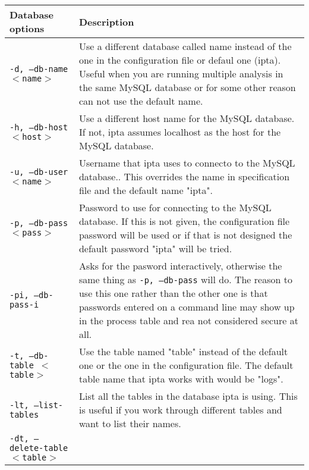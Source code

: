 \documentclass[english,twoside,openright,a4paper,12pt]{article}
\begin{document}
\begin{longtable}{|p{}|p{}|}
\hline
\textbf{Database options} & \textbf{Description}\\ \hline

\texttt{-d, --db-name $<$name$>$} & Use a different database called
name instead of the one in the configuration file or defaul one
(ipta). Useful when you are running multiple analysis in the same
MySQL database or for some other reason can not use the default
name.\\\hline

\texttt{-h, --db-host $<$host$>$} & 

Use a different host name for the
MySQL database. If not, ipta assumes localhost as the host for the
MySQL database.\\\hline

\texttt{-u, --db-user $<$name$>$} & 

Username that ipta uses to connecto to the MySQL database.. This
overrides the name in specification file and the default name "ipta".
\\\hline

\texttt{-p, --db-pass $<$pass$>$} & 

Password to use for connecting to the MySQL database. If this is not
given, the configuration file password will be used or if that is not
designed the default password "ipta" will be tried.\\\hline

\texttt{-pi, --db-pass-i} & 

Asks for the pasword interactively, otherwise the same thing as
\texttt{-p, --db-pass} will do. The reason to use this one rather than
the other one is that passwords entered on a command line may show up
in the process table and rea not considered secure at all.\\\hline

\texttt{-t, --db-table $<$table$>$} & 

Use the table named "table" instead of the default one or the one in
the configuration file. The default table name that ipta works with
would be "logs".\\\hline

\texttt{-lt, --list-tables} & 

List all the tables in the database ipta is using. This is useful if
you work through different tables and want to list their
names.\\\hline

\texttt{-dt, --delete-table $<$table$>$} & 


\end{longtable}
\end{document}
